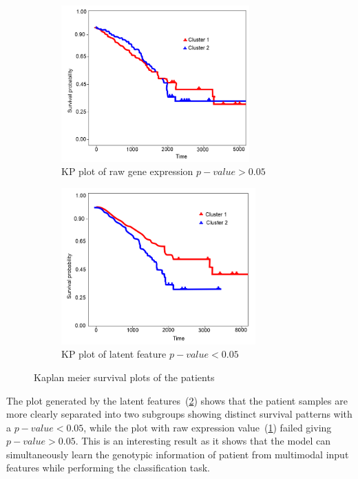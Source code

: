 \begin{figure}[h]
	\centering
	\begin{subfigure}{.48\linewidth}
		\centering
		\includegraphics[width=\linewidth,height=60mm]{images/raw_cluster.png}
		\caption{KP plot of raw gene expression $p-value>0.05$}
        \label{fig:km1}
	\end{subfigure}
	\begin{subfigure}{0.48\linewidth}
		\centering
		\includegraphics[width=\linewidth,height=60mm]{images/ae_cluster.png}
		\caption{KP plot of latent feature $p-value<0.05$}
        \label{fig:km2}
	\end{subfigure}
	\caption{Kaplan meier survival plots of the patients~\cite{karimACCESS2019}} 
	\label{fig:km_sur_plot}
\end{figure}

\hspace*{3.5mm} The plot generated by the latent features~(\cref{fig:km2}) shows that the patient samples are more clearly separated into two subgroups showing distinct survival patterns with a $p-value<0.05$, while the plot with raw expression value~(\cref{fig:km1}) failed giving $p-value>0.05$. This is an interesting result as it shows that the model can simultaneously learn the genotypic information of patient from multimodal input features while performing the classification task.

